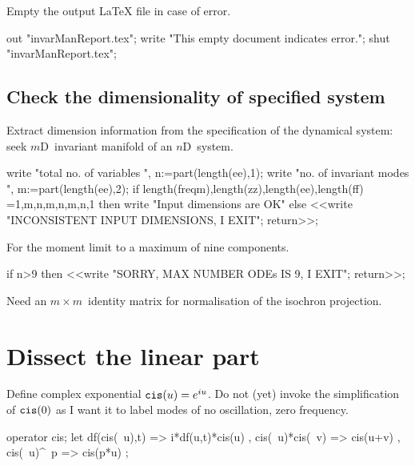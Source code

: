 \documentclass[11pt,a5paper]{article}
\begin{document}

Empty the output LaTeX file in case of error.
\begin{reduce}
out "invarManReport.tex";
write "This empty document indicates error.";
shut "invarManReport.tex";
\end{reduce}


 


\subsection{Check the dimensionality of specified system}
Extract dimension information from the specification of the
dynamical system: seek $m$D~invariant manifold of an
$n$D~system.
\begin{reduce}
write "total no. of variables ",
n:=part(length(ee),1);
write "no. of invariant modes ",
m:=part(length(ee),2);
if {length(freqm),length(zz),length(ee),length(ff)}
  ={{1,m},{n,m},{n,m},{n,1}} 
  then write "Input dimensions are OK" 
  else <<write "INCONSISTENT INPUT DIMENSIONS, I EXIT"; 
      return>>;
\end{reduce}

For the moment limit to a maximum of nine components.
\begin{reduce}
if n>9 then <<write "SORRY, MAX NUMBER ODEs IS 9, I EXIT"; 
    return>>;
\end{reduce}

Need an \(m\times m\)~identity matrix for normalisation of the isochron projection.


\section{Dissect the linear part}

Define complex exponential $\verb|cis|(u)=e^{iu}$.
Do not (yet) invoke the simplification of $\verb|cis|(0)$ as I want it to label modes of no oscillation, zero frequency.

\begin{reduce}
operator cis;
let { df(cis(~u),t) => i*df(u,t)*cis(u)
    , cis(~u)*cis(~v) => cis(u+v)
    , cis(~u)^~p => cis(p*u)
    };
\end{reduce}
\end{document}

